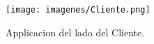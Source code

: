 \begin{figure}[H]
  \centering
  \texttt{[image: imagenes/Cliente.png]}
  \caption{Applicacion del lado del Cliente.}
\end{figure}
